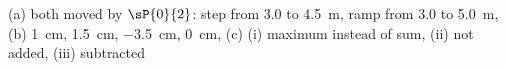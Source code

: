 (a) both moved by $\sP{0}{2}$: step from 3.0 to \SI{4.5}{\m}, ramp from 3.0 to \SI{5.0}{\m}, (b) \SI{1}{\cm}, \SI{1.5}{\cm}, \SI{-3.5}{\cm}, \SI{0}{\cm}, (c) (i) maximum instead of sum, (ii) not added, (iii) subtracted
